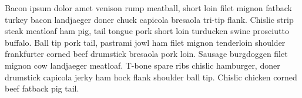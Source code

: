 

Bacon ipsum dolor amet venison rump meatball, short loin filet mignon fatback turkey bacon landjaeger doner chuck capicola bresaola tri-tip flank. Chislic strip steak meatloaf ham pig, tail tongue pork short loin turducken swine prosciutto buffalo. Ball tip pork tail, pastrami jowl ham filet mignon tenderloin shoulder frankfurter corned beef drumstick bresaola pork loin. Sausage burgdoggen filet mignon cow landjaeger meatloaf. T-bone spare ribs chislic hamburger, doner drumstick capicola jerky ham hock flank shoulder ball tip. Chislic chicken corned beef fatback pig tail.